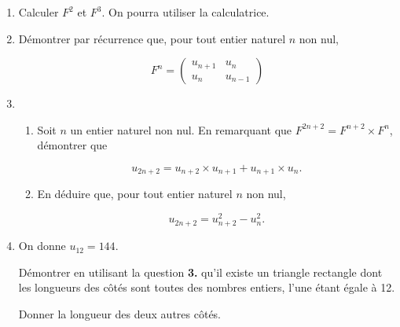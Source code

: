 \documentclass[10pt,a4paper]{article}
\begin{document}
\begin{enumerate}
\item Calculer $F^2$ et $F^3$. On pourra utiliser la calculatrice.
\item Démontrer par récurrence que, pour tout entier naturel $n$ non nul,

\[F^n = \begin{pmatrix} u_{n+1} & u_n \\ u_n & u_{n-1} \end{pmatrix}\]

\item 
\begin{enumerate}
\item Soit $n$ un entier naturel non nul. En remarquant que
$F^{2n+2} = F^{n+2}\times F^{n}$, démontrer que

\[u_{2n+2} =u_{n+2}\times u_{n+1}+ u_{n+1}\times u_n.\]

\item En déduire que, pour tout entier naturel $n$ non nul,

\[u_{2n+2} = u_{n+2}^2 - u_n^2.\]
\end{enumerate}

\item On donne $u_{12}=144$.

Démontrer en utilisant la question \textbf{3.} qu'il existe un triangle rectangle dont les longueurs des côtés sont toutes des nombres entiers, l'une étant égale à 12.

Donner la longueur des deux autres côtés.
\end{enumerate}
\end{document}
